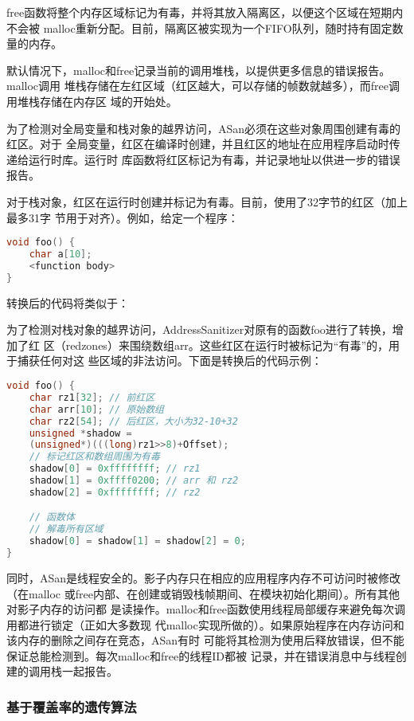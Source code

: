 free函数将整个内存区域标记为有毒，并将其放入隔离区，以便这个区域在短期内不会被
malloc重新分配。目前，隔离区被实现为一个FIFO队列，随时持有固定数量的内存。

默认情况下，malloc和free记录当前的调用堆栈，以提供更多信息的错误报告。malloc调用
堆栈存储在左红区域（红区越大，可以存储的帧数就越多），而free调用堆栈存储在内存区
域的开始处。

为了检测对全局变量和栈对象的越界访问，ASan必须在这些对象周围创建有毒的红区。对于
全局变量，红区在编译时创建，并且红区的地址在应用程序启动时传递给运行时库。运行时
库函数将红区标记为有毒，并记录地址以供进一步的错误报告。

对于栈对象，红区在运行时创建并标记为有毒。目前，使用了32字节的红区（加上最多31字
节用于对齐）。例如，给定一个程序：

\begin{lstlisting}[language=C++]
void foo() {
	char a[10];
	<function body>
}
\end{lstlisting}

转换后的代码将类似于：

为了检测对栈对象的越界访问，AddressSanitizer对原有的函数foo进行了转换，增加了红
区（redzones）来围绕数组arr。这些红区在运行时被标记为“有毒”的，用于捕获任何对这
些区域的非法访问。下面是转换后的代码示例：

\begin{lstlisting}[language=C++]
void foo() {
	char rz1[32]; // 前红区
	char arr[10]; // 原始数组
	char rz2[54]; // 后红区，大小为32-10+32
	unsigned *shadow =
	(unsigned*)(((long)rz1>>8)+Offset);
	// 标记红区和数组周围为有毒
	shadow[0] = 0xffffffff; // rz1
	shadow[1] = 0xffff0200; // arr 和 rz2
	shadow[2] = 0xffffffff; // rz2

	// 函数体
	// 解毒所有区域
	shadow[0] = shadow[1] = shadow[2] = 0;
}
\end{lstlisting}

同时，ASan是线程安全的。影子内存只在相应的应用程序内存不可访问时被修改（在malloc
或free内部、在创建或销毁栈帧期间、在模块初始化期间）。所有其他对影子内存的访问都
是读操作。malloc和free函数使用线程局部缓存来避免每次调用都进行锁定（正如大多数现
代malloc实现所做的）。如果原始程序在内存访问和该内存的删除之间存在竞态，ASan有时
可能将其检测为使用后释放错误，但不能保证总能检测到。每次malloc和free的线程ID都被
记录，并在错误消息中与线程创建的调用栈一起报告。

\subsubsection{基于覆盖率的遗传算法}

